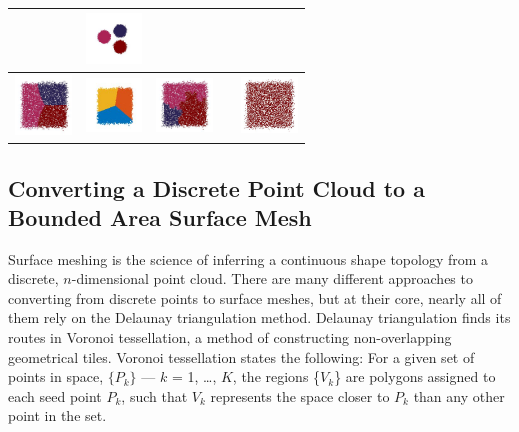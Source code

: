 \documentclass[12pt]{drexelthesis}
\begin{document}
\begin{table}[h!]
\begin{center}
\begin{tabular}{ | c | p{3cm} | p{3cm} | p{3cm} | p{3cm} | }
      &
            \includegraphics[trim={0 1.5cm 0 1.5cm},clip,width=1.5cm]{2d-cluster-tests/euclidean-distance/solid_circles.jpg}
      \\ \hline
      
            \includegraphics[trim={0 1cm 0 1cm},clip,width=1.5cm]{2d-cluster-tests/k-means/plane.jpg}
      & 
            \includegraphics[trim={0 0cm 0 1cm},clip,width=1.5cm]{2d-cluster-tests/fcm/plane.jpg}
      & 
            \includegraphics[trim={0 1cm 0 1cm},clip,width=1.5cm]{2d-cluster-tests/agglomerative/plane.jpg}
      &
      
      &
            \includegraphics[trim={0 1cm 0 1cm},clip,width=1.5cm]{2d-cluster-tests/euclidean-distance/plane.jpg}
      \\ \hline
      
      \end{tabular}
      \end{center}
      \end{table}


\subsection{Converting a Discrete Point Cloud to a Bounded Area Surface Mesh} 
Surface meshing is the science of inferring a continuous shape topology from a discrete, $n$-dimensional point cloud. There are many different approaches to converting from discrete points to surface meshes, but at their core, nearly all of them rely on the Delaunay triangulation method.
Delaunay triangulation finds its routes in Voronoi tessellation, a method of constructing non-overlapping geometrical tiles. Voronoi tessellation states the following:
For a given set of points in space, $\{P_{k}\}$ --- $k$ = 1, \ldots, $K$, the regions \{$V_{k}$\} are polygons assigned to each seed point $P_{k}$, such that $V_{k}$ represents the space closer to $P_{k}$ than any other point in the set.
\end{document}
